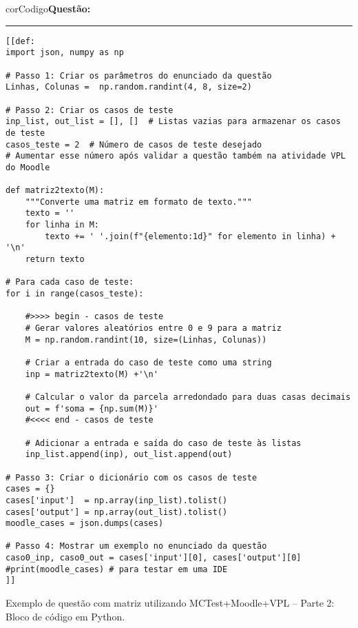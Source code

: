 \begin{listing}[!ht]
\begin{myboxCode}{corCodigo}{\textbf{Questão: } }\vspace{3mm}
\hrule
\begin{verbatim}
[[def: 
import json, numpy as np

# Passo 1: Criar os parâmetros do enunciado da questão
Linhas, Colunas =  np.random.randint(4, 8, size=2)
    
# Passo 2: Criar os casos de teste
inp_list, out_list = [], []  # Listas vazias para armazenar os casos de teste
casos_teste = 2  # Número de casos de teste desejado
# Aumentar esse número após validar a questão também na atividade VPL do Moodle

def matriz2texto(M):
    """Converte uma matriz em formato de texto."""
    texto = ''
    for linha in M:
        texto += ' '.join(f"{elemento:1d}" for elemento in linha) + '\n'
    return texto
    
# Para cada caso de teste:
for i in range(casos_teste):    

    #>>>> begin - casos de teste
    # Gerar valores aleatórios entre 0 e 9 para a matriz 
    M = np.random.randint(10, size=(Linhas, Colunas)) 

    # Criar a entrada do caso de teste como uma string
    inp = matriz2texto(M) +'\n'

    # Calcular o valor da parcela arredondado para duas casas decimais
    out = f'soma = {np.sum(M)}'
    #<<<< end - casos de teste

    # Adicionar a entrada e saída do caso de teste às listas
    inp_list.append(inp), out_list.append(out)

# Passo 3: Criar o dicionário com os casos de teste
cases = {}
cases['input']  = np.array(inp_list).tolist()
cases['output'] = np.array(out_list).tolist()
moodle_cases = json.dumps(cases)

# Passo 4: Mostrar um exemplo no enunciado da questão
caso0_inp, caso0_out = cases['input'][0], cases['output'][0]
#print(moodle_cases) # para testar em uma IDE
]]
\end{verbatim}
\end{myboxCode}
\caption{Exemplo de questão com matriz utilizando MCTest+Moodle+VPL -- Parte 2: Bloco de código em Python.}
\label{lst:questaoQT_EP_2_matriz_parte2}
\end{listing}

